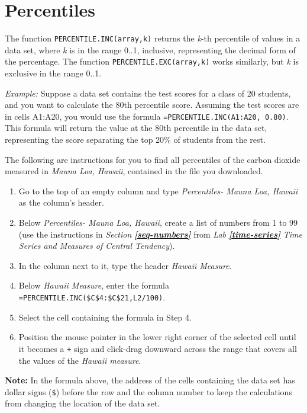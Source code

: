 \documentclass[
  12pt,
  letterpaper,
]{book}
\begin{document}
\hypertarget{percentiles}{%
\section{Percentiles}\label{percentiles}}

The function \texttt{PERCENTILE.INC(array,k)} returns the \emph{k}-th percentile of values in a data set, where \emph{k} is in the range 0..1, inclusive, representing the decimal form of the percentage. The function \texttt{PERCENTILE.EXC(array,k)} works similarly, but \emph{k} is exclusive in the range 0..1.

\emph{Example:} Suppose a data set contains the test scores for a class of 20 students, and you want to calculate the 80th percentile score. Assuming the test scores are in cells A1:A20, you would use the formula \texttt{=PERCENTILE.INC(A1:A20,\ 0.80)}. This formula will return the value at the 80th percentile in the data set, representing the score separating the top 20\% of students from the rest.

The following are instructions for you to find all percentiles of the carbon dioxide measured in \emph{Mauna Loa, Hawaii}, contained in the file you downloaded.

\begin{enumerate}
\def\labelenumi{\arabic{enumi}.}
\item
  Go to the top of an empty column and type \emph{Percentiles- Mauna Loa, Hawaii} as the column's header.
\item
  Below \emph{Percentiles- Mauna Loa, Hawaii}, create a list of numbers from 1 to 99 (use the instructions in \emph{Section} \textbf{\emph{\ref{seq-numbers}}} from \emph{Lab} \textbf{\emph{\ref{time-series}}} \emph{Time Series and Measures of Central Tendency}).
\item
  In the column next to it, type the header \emph{Hawaii Measure}.
\item
  Below \emph{Hawaii Measure}, enter the formula \texttt{=PERCENTILE.INC(\$C\$4:\$C\$21,L2/100)}.
\item
  Select the cell containing the formula in Step 4.
\item
  Position the mouse pointer in the lower right corner of the selected cell until it becomes a \texttt{+} sign and click-drag downward across the range that covers all the values of the \emph{Hawaii measure}.
\end{enumerate}

\textbf{Note:} In the formula above, the address of the cells containing the data set has dollar signs (\texttt{\$}) before the row and the column number to keep the calculations from changing the location of the data set.
\end{document}
